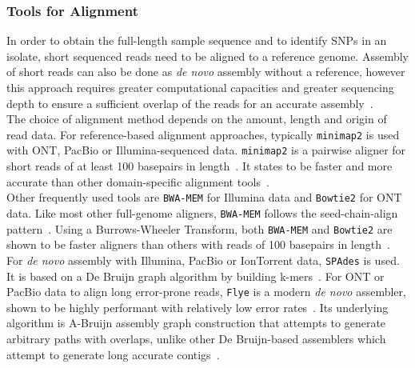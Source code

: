 \subsubsection*{Tools for Alignment}
In order to obtain the full-length sample sequence and to identify \acp{SNP} in an isolate, short sequenced reads need to be aligned to a reference genome. Assembly of short reads can also be done as \textit{de novo} assembly without a reference, however this approach requires greater computational capacities and greater sequencing depth to ensure a sufficient overlap of the reads for an accurate assembly~\cite{ekblom2014field}. \\
The choice of alignment method depends on the amount, length and origin of read data. For reference-based alignment approaches, typically \texttt{minimap2} is used with \ac{ONT}, PacBio or Illumina-sequenced data. \texttt{minimap2} is a pairwise aligner for short reads of at least 100 basepairs in length~\cite{li2018minimap2}. It states to be faster and more accurate than other domain-specific alignment tools~\cite{li2018minimap2}. \\
Other frequently used tools are \texttt{BWA-MEM} for Illumina data and \texttt{Bowtie2} for \ac{ONT} data. Like most other full-genome aligners, \texttt{BWA-MEM} follows the seed-chain-align pattern~\cite{li2013aligning}. Using a Burrows-Wheeler Transform, both \texttt{BWA-MEM} and \texttt{Bowtie2} are shown to be faster aligners than others with reads of 100 basepairs in length~\cite{borozan2013evaluation}. \\
For \textit{de novo} assembly with Illumina, PacBio or IonTorrent data, \texttt{SPAdes} is used. It is based on a De Bruijn graph algorithm by building k-mers~\cite{bankevich2012spades}. For \ac{ONT} or PacBio data to align long error-prone reads, \texttt{Flye} is a modern \textit{de novo} assembler, shown to be highly performant with relatively low error rates~\cite{kolmogorov2019assembly, dida2021empirical}. Its underlying algorithm is A-Bruijn assembly graph construction that attempts to generate arbitrary paths with overlaps, unlike other De Bruijn-based assemblers which attempt to generate long accurate contigs~\cite{kolmogorov2019assembly}. 

